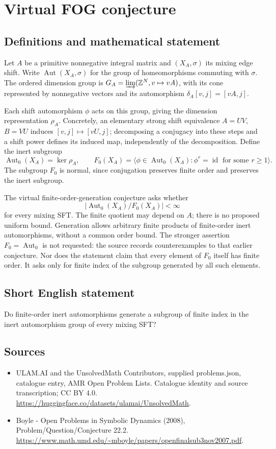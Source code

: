 \documentclass[11pt,a4paper]{article}
\begin{document}
\section*{Virtual FOG conjecture}\label{statement}

\subsection{Definitions and mathematical statement}
Let $A$ be a primitive nonnegative integral matrix and $(X_A,\sigma)$
its mixing edge shift. Write $\operatorname{Aut}(X_A,\sigma)$ for the
group of homeomorphisms commuting with $\sigma$. The ordered dimension
group is $G_A=\varinjlim(\mathbb Z^N,v\mapsto vA)$, with its cone
represented by nonnegative vectors and its automorphism
$\delta_A[v,j]=[vA,j]$.

Each shift automorphism $\phi$ acts on this group, giving the dimension
representation $\rho_A$. Concretely, an elementary strong shift
equivalence $A=UV$, $B=VU$ induces $[v,j]\mapsto[vU,j]$; decomposing
a conjugacy into these steps and a shift power defines its induced map,
independently of the decomposition. Define the inert subgroup
\[
 \operatorname{Aut}_0(X_A)=\ker\rho_A,
 \qquad
 F_0(X_A)=\langle\phi\in\operatorname{Aut}_0(X_A):
                      \phi^r=\operatorname{id}\text{ for some }r\ge1\rangle.
\]
The subgroup $F_0$ is normal, since conjugation preserves finite order
and preserves the inert subgroup.

The virtual finite-order-generation conjecture asks whether
\[
 |\operatorname{Aut}_0(X_A)/F_0(X_A)|<\infty
\]
for every mixing SFT. The finite quotient may depend on $A$; there is
no proposed uniform bound. Generation allows arbitrary finite products
of finite-order inert automorphisms, without a common order bound.
The stronger assertion $F_0=\operatorname{Aut}_0$ is not requested:
the source records counterexamples to that earlier conjecture. Nor
does the statement claim that every element of $F_0$ itself has finite
order. It asks only for finite index of the subgroup generated by
all such elements.
\subsection{Short English statement}
Do finite-order inert automorphisms generate a subgroup of finite index in the inert automorphism group of every mixing SFT?
\subsection{Sources}
\begin{itemize}
\item[S1] ULAM.AI and the UnsolvedMath Contributors, supplied problems.json, catalogue entry, AMR Open Problem Lists. Catalogue identity and source transcription; CC BY 4.0.
\url{https://huggingface.co/datasets/ulamai/UnsolvedMath}.
\item[S2] Boyle - Open Problems in Symbolic Dynamics (2008), Problem/Question/Conjecture 22.2. 
\url{https://www.math.umd.edu/~mboyle/papers/openfinalsub3nov2007.pdf}.
\end{itemize}
\end{document}
